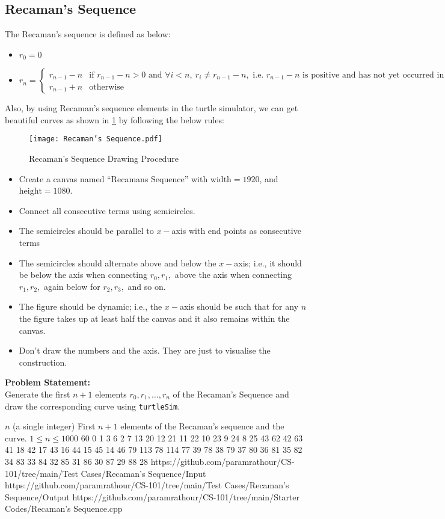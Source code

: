 \documentclass[../../Problems]{subfiles}
\begin{document}
\recalctypearea
\subsection{Recaman's Sequence}{\label{pp:recamanssequence}}
The Recaman's sequence is defined as below:
\begin{itemize}
	\item $r_0 = 0$
	\item $r_n = \begin{cases}
		r_{n-1} - n & \text{if } r_{n-1}-n>0 \text{ and } \forall i <n,\ r_i\neq r_{n-1}-n, \text{ i.e. $r_{n-1}-n$ is positive and has not yet occurred in the sequence}\\
		r_{n-1} + n & \text{otherwise}
	\end{cases}$
\end{itemize}
Also, by using Recaman's sequence elements in the turtle simulator, we can get beautiful curves as shown in \ref{fig:recamanssequence} by following the below rules:
\begin{figure}[H]
	\centering
	\texttt{[image: Recaman's Sequence.pdf]}
	\caption{Recaman's Sequence Drawing Procedure}
	\label{fig:recamanssequence}
\end{figure}
\begin{itemize}
\item Create a canvas named ``Recamans Sequence'' with $\text{width}=1920$, and $\text{height}=1080$.
\item Connect all consecutive terms using semicircles.
\item The semicircles should be parallel to $x-$axis with end points as consecutive terms
\item The semicircles should alternate above and below the $x-$axis; i.e., it should be below the axis when connecting $r_0, r_1,$ above the axis when connecting $r_1, r_2,$ again below for $r_2, r_3,$ and so on.
\item The figure should be dynamic; i.e., the $x-$axis should be such that for any $n$ the figure takes up at least half the canvas and it also remains within the canvas.
\item Don't draw the numbers and the axis. They are just to visualise the construction.
\end{itemize}
\textbf{Problem Statement:}\\
Generate the first $n+1$ elements $r_0,r_1,\ldots,r_n$ of the Recaman's Sequence and draw the corresponding curve using \verb!turtleSim!.
\begin{testcasesMore}
	{$n$ \hfill(a single integer)}
	{First $n+1$ elements of the Recaman's sequence and the curve.}
	{$1 \leq n \leq 1000$}
	{60}
	{0 1 3 6 2 7 13 20 12 21 11 22 10 23 9 24 8 25 43 62 42 63 41 18 42 17 43 16 44 15 45 14 46 79 113 78 114 77 39 78 38 79 37 80 36 81 35 82 34 83 33 84 32 85 31 86 30 87 29 88 28}
	{https://github.com/paramrathour/CS-101/tree/main/Test Cases/Recaman's Sequence/Input}
	{https://github.com/paramrathour/CS-101/tree/main/Test Cases/Recaman's Sequence/Output}
	{https://github.com/paramrathour/CS-101/tree/main/Starter Codes/Recaman's Sequence.cpp}
\end{testcasesMore}
\end{document}
